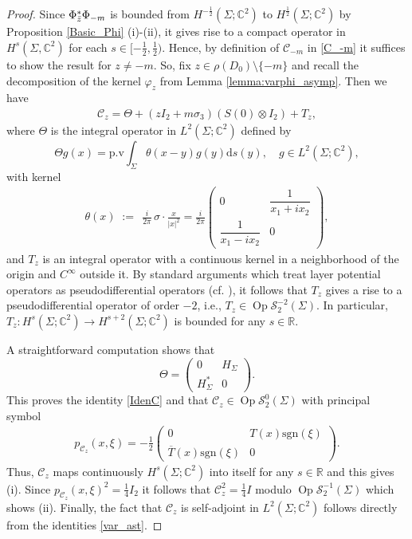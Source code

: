 \documentclass[11pt,a4paper,reqno,oneside]{amsproc}
\DeclareMathOperator{\Op}{Op}
\newcommand{\cS}{\mathcal{S}}
\def \rr {{\mathbb R}}
\def \cc {{\mathbb C}}
\numberwithin{equation}{section}
\def \cc {{\mathbb{C}}}
\begin{document}
\begin{proof}   Since $\Phi^\ast_{\Bar{z}}\Phi_{-m}$ is bounded from $H^{-\frac{1}{2}}(\Sigma;\cc^2)$ to $H^{\frac{1}{2}}(\Sigma;\cc^2)$ by Proposition \ref{Basic_Phi} (i)-(ii), it gives rise to a compact operator in $H^s(\Sigma,\cc^2)$ for each $s\in[-\frac{1}{2},\frac{1}{2})$. Hence, by definition of $\mathscr C_{-m}$  in \eqref{C_-m}  it suffices to show the result for $z\neq -m$. So, fix $z\in \rho(D_0)\setminus\{-m\}$ and recall the decomposition of the kernel $\varphi_z$ from Lemma \ref{lemma:varphi_asymp}. Then we have
\begin{align*}
\mathscr C_z= \Theta + (z I_2+m\sigma_3)(S(0) \otimes I_2) + T_z, 
\end{align*}
where $\Theta$ is the integral operator in $L^2(\Sigma;\cc^2)$ defined by
\[
\Theta g(x)=\mathrm{p.v } \int_\Sigma\theta(x-y)g(y)\mathrm{d}s(y), \quad g\in L^2(\Sigma;\cc^2),
\]
 with kernel 
\begin{align*}
     \theta (x) \;:=\; \,\frac{i}{2\pi}\,\sigma\!\cdot\!\frac{x}{|x|^2}=\frac{i}{2\pi}\left(\begin{array}{cc}
0& \dfrac{1}{x_1+ix_2} \\
\dfrac{1}{x_1-ix_2} & 0
\end{array}\right),
\end{align*}
and  $T_z$ is an integral operator with a  continuous kernel in a neighborhood of the origin and $C^\infty$ outside it. By standard arguments which treat layer potential operators as pseudodifferential operators (cf. \cite[Chap. 7, Sec. 11]{T1}), it follows that $T_z$ gives a rise to a pseudodifferential operator of order $-2$, i.e., $T_z \in \Op \cS^{-2}_{2}(\Sigma)$. In particular, $T_z: H^{s}(\Sigma;\cc^2) \rightarrow H^{s+2}(\Sigma;\cc^2)$ is bounded for any $s\in\rr$.

A straightforward computation shows that 
 \begin{equation*}
\Theta=   \begin{pmatrix} 
	       0& H_\Sigma\\ 
	H^*_\Sigma & 0 \, 
	   \end{pmatrix}.
\end{equation*} 
This proves the identity \eqref{IdenC} and that $\mathscr{C}_{z}\in \Op \cS^0_2(\Sigma)$ with principal symbol
\begin{align}\label{symbol_C}
    p_{\mathscr{C}_{z}}(x,\xi)= -\frac{1}{2} \begin{pmatrix} 
	       0& T(x) \mathrm{sgn}(\xi) \\ 
	\overline{T}(x) \mathrm{sgn}(\xi)  & 0 \, 
	   \end{pmatrix}.
\end{align}
Thus, $\mathscr{C}_{z}$ maps continuously $H^s(\Sigma;\cc^2)$ into itself for any $s\in\rr$ and this gives (i). Since $ p_{\mathscr{C}_{z}}(x,\xi)^2= \frac{1}{4} I_2$ it follows that $\mathscr{C}_z^2= \frac{1}{4}I$ modulo  $\Op \cS^{-1}_2(\Sigma)$ which shows (ii).  Finally, the fact that $\mathscr{C}_z$ is self-adjoint in $L^2(\Sigma;\cc^2)$  follows directly from the identities \eqref{var_ast}.
\end{proof}
\end{document}
